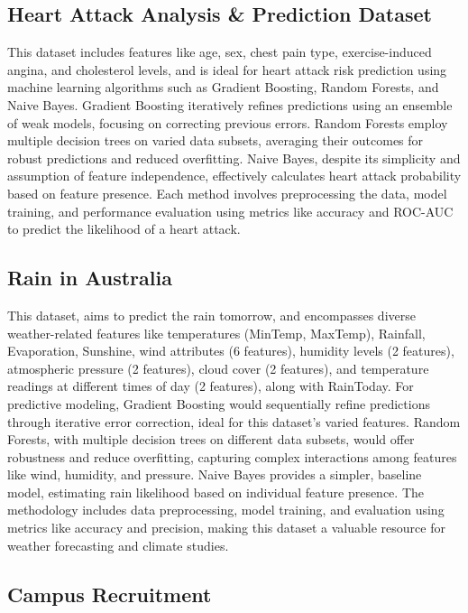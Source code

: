 \documentclass[10pt,twocolumn,letterpaper]{article}
\begin{document}
\subsection{Heart Attack Analysis \& Prediction Dataset \cite{ds2}}

This dataset includes features like age, sex, chest pain type, exercise-induced angina, and cholesterol levels, and is ideal for heart attack risk prediction using machine learning algorithms such as Gradient Boosting, Random Forests, and Naive Bayes.
Gradient Boosting iteratively refines predictions using an ensemble of weak models, focusing on correcting previous errors.
Random Forests employ multiple decision trees on varied data subsets, averaging their outcomes for robust predictions and reduced overfitting.
Naive Bayes, despite its simplicity and assumption of feature independence, effectively calculates heart attack probability based on feature presence.
Each method involves preprocessing the data, model training, and performance evaluation using metrics like accuracy and ROC-AUC to predict the likelihood of a heart attack.

\subsection{Rain in Australia \cite{ds3}}

This dataset, aims to predict the rain tomorrow, and encompasses diverse weather-related features like temperatures (MinTemp, MaxTemp), Rainfall, Evaporation, Sunshine, wind attributes (6 features), humidity levels (2 features), atmospheric pressure (2 features), cloud cover (2 features), and temperature readings at different times of day (2 features), along with RainToday.
For predictive modeling, Gradient Boosting would sequentially refine predictions through iterative error correction, ideal for this dataset’s varied features.
Random Forests, with multiple decision trees on different data subsets, would offer robustness and reduce overfitting, capturing complex interactions among features like wind, humidity, and pressure.
Naive Bayes provides a simpler, baseline model, estimating rain likelihood based on individual feature presence.
The methodology includes data preprocessing, model training, and evaluation using metrics like accuracy and precision, making this dataset a valuable resource for weather forecasting and climate studies.

\subsection{Campus Recruitment \cite{ds4}}
\end{document}
